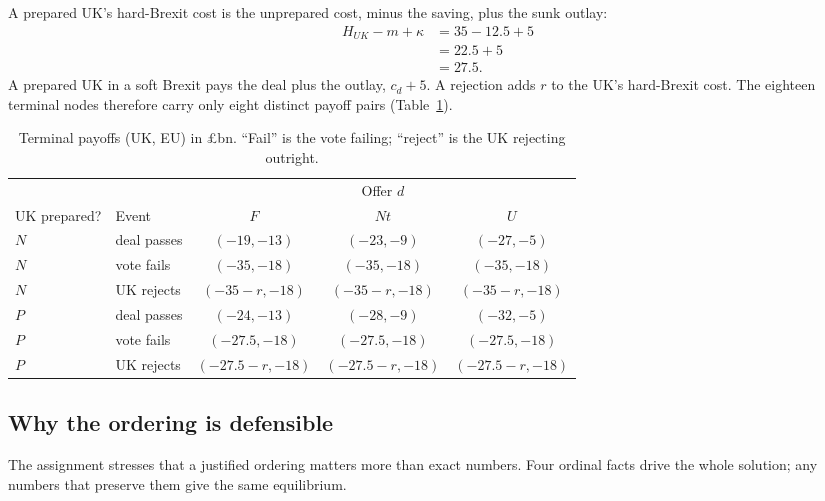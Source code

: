 \documentclass[11pt,a4paper]{article}
\newcommand{\gbp}{\pounds}
\newcommand{\Nt}{\mathit{Nt}}
\newcommand{\dF}{\mathit{F}}
\newcommand{\dU}{\mathit{U}}
\begin{document}
A prepared UK's hard-Brexit cost is the unprepared cost, minus the saving, plus the sunk outlay:
\begin{align*}
  H_{UK}-m+\kappa &= 35-12.5+5\\
                  &= 22.5+5\\
                  &= 27.5 .
\end{align*}
A prepared UK in a soft Brexit pays the deal plus the outlay, $c_d+5$. A rejection adds $r$ to the
UK's hard-Brexit cost. The eighteen terminal nodes therefore carry only eight distinct payoff
pairs (Table~\ref{tab:leaves}).

\begin{table}[h]
\centering
\caption{Terminal payoffs (UK, EU) in \gbp bn. ``Fail'' is the vote failing; ``reject'' is the
UK rejecting outright.}\label{tab:leaves}
\begin{tabular}{llccc}
\toprule
& & \multicolumn{3}{c}{Offer $d$} \\
\cmidrule(lr){3-5}
UK prepared? & Event & $\dF$ & $\Nt$ & $\dU$ \\
\midrule
$N$ & deal passes   & $(-19,-13)$ & $(-23,-9)$ & $(-27,-5)$ \\
$N$ & vote fails    & $(-35,-18)$ & $(-35,-18)$ & $(-35,-18)$ \\
$N$ & UK rejects    & $(-35-r,-18)$ & $(-35-r,-18)$ & $(-35-r,-18)$ \\
\midrule
$P$ & deal passes   & $(-24,-13)$ & $(-28,-9)$ & $(-32,-5)$ \\
$P$ & vote fails    & $(-27.5,-18)$ & $(-27.5,-18)$ & $(-27.5,-18)$ \\
$P$ & UK rejects    & $(-27.5-r,-18)$ & $(-27.5-r,-18)$ & $(-27.5-r,-18)$ \\
\bottomrule
\end{tabular}
\end{table}

\subsection{Why the ordering is defensible}

The assignment stresses that a justified ordering matters more than exact numbers. Four ordinal
facts drive the whole solution; any numbers that preserve them give the same equilibrium.
\end{document}
